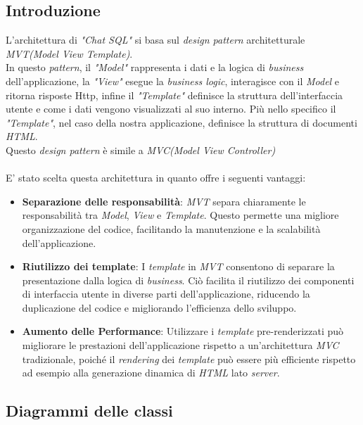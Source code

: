 \documentclass[5pt]{article}
\begin{document}
	\subsection{Introduzione}
L'architettura di \textit{"Chat SQL"} si basa sul \textit{design pattern} architetturale \textit{MVT(Model View Template)}.\\

In questo \textit{pattern}, il \textit{"Model"} rappresenta i dati e la logica di \textit{business} dell'applicazione, la \textit{"View"} esegue la \textit{business logic}, interagisce con il \textit{Model} e ritorna risposte Http, infine  il \textit{"Template"} definisce la struttura dell'interfaccia utente e come i dati vengono visualizzati al suo interno. Più nello specifico il \textit{"Template"}, nel caso della nostra applicazione, definisce la struttura di documenti \textit{HTML}.\\

Questo \textit{design pattern} è simile a \textit{MVC(Model View Controller)} \\\\
E' stato scelta questa architettura in quanto offre i seguenti vantaggi:
\begin{itemize}
    \item \textbf{Separazione delle responsabilità}: \textit{MVT} separa chiaramente le responsabilità tra \textit{Model}, \textit{View} e \textit{Template}. Questo permette una migliore organizzazione del codice, facilitando la manutenzione e la scalabilità dell'applicazione.

    \item \textbf{Riutilizzo dei template}: I \textit{template} in \textit{MVT} consentono di separare la presentazione dalla logica di \textit{business}. Ciò facilita il riutilizzo dei componenti di interfaccia utente in diverse parti dell'applicazione, riducendo la duplicazione del codice e migliorando l'efficienza dello sviluppo.

    \item \textbf{Aumento delle Performance}: Utilizzare i \textit{template} pre-renderizzati può migliorare le prestazioni dell'applicazione rispetto a un'architettura \textit{MVC} tradizionale, poiché il \textit{rendering} dei \textit{template} può essere più efficiente rispetto ad esempio alla generazione dinamica di \textit{HTML} lato \textit{server}.

\end{itemize}
	
	\subsection{Diagrammi delle classi}
	
\end{document}

